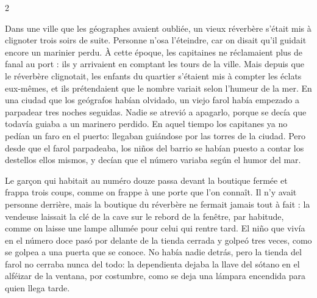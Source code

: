 \begin{paracol}{2}

\pair
  {}
  {}


\pair
  {\noindent Dans une ville que les géographes avaient oubliée, un vieux
   réverbère s'était mis à clignoter trois soirs de suite. Personne n'osa
   l'éteindre, car on disait qu'il guidait encore un marinier perdu. À cette
   époque, les capitaines ne réclamaient plus de fanal au port : ils y
   arrivaient en comptant les tours de la ville. Mais depuis que le réverbère
   clignotait, les enfants du quartier s'étaient mis à compter les éclats
   eux-mêmes, et ils prétendaient que le nombre variait selon l'humeur de la mer.}
  {\noindent En una ciudad que los geógrafos habían olvidado, un viejo farol
   había empezado a parpadear tres noches seguidas. Nadie se atrevió a
   apagarlo, porque se decía que todavía guiaba a un marinero perdido. En
   aquel tiempo los capitanes ya no pedían un faro en el puerto: llegaban
   guiándose por las torres de la ciudad. Pero desde que el farol parpadeaba,
   los niños del barrio se habían puesto a contar los destellos ellos mismos,
   y decían que el número variaba según el humor del mar.}

\pair
  {Le garçon qui habitait au numéro douze passa devant la boutique fermée et
   frappa trois coups, comme on frappe à une porte que l'on connaît. Il n'y
   avait personne derrière, mais la boutique du réverbère ne fermait jamais
   tout à fait : la vendeuse laissait la clé de la cave sur le rebord de la
   fenêtre, par habitude, comme on laisse une lampe allumée pour celui qui
   rentre tard.}
  {El niño que vivía en el número doce pasó por delante de la tienda cerrada
   y golpeó tres veces, como se golpea a una puerta que se conoce. No había
   nadie detrás, pero la tienda del farol no cerraba nunca del todo: la
   dependienta dejaba la llave del sótano en el alféizar de la ventana, por
   costumbre, como se deja una lámpara encendida para quien llega tarde.}


\end{paracol}
